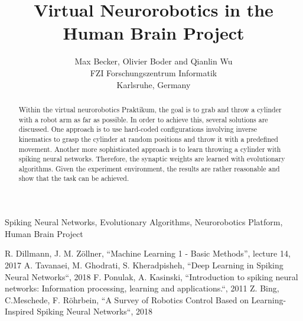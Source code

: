 \documentclass[conference]{IEEEtran}
\begin{document}
\title{Virtual Neurorobotics in the Human Brain Project}
\author{Max Becker, Olivier Boder and Qianlin Wu\\FZI Forschungszentrum Informatik\\Karlsruhe, Germany}

\maketitle
\thispagestyle{plain}
\pagestyle{plain}

\begin{abstract}
Within the virtual neurorobotics Praktikum, the goal is to grab and throw a cylinder with a robot arm as far as possible.
In order to achieve this, several solutions are discussed.
One approach is to use hard-coded configurations involving inverse kinematics to grasp the cylinder at random positions and throw it with a predefined movement.
Another more sophisticated approach is to learn throwing a cylinder with spiking neural networks.
Therefore, the synaptic weights are learned with evolutionary algorithms.
Given the experiment environment, the results are rather reasonable and show that the task can be achieved.
\end{abstract}


\begin{IEEEkeywords}
Spiking Neural Networks, Evolutionary Algorithms, Neurorobotics Platform, Human Brain Project
\end{IEEEkeywords}












\begin{thebibliography}{00}
 R. Dillmann, J. M. Z{\"o}llner, ``Machine Learning 1 - Basic Methods'', lecture 14, 2017
 A. Tavanaei, M. Ghodrati, S. Kheradpisheh, ``Deep Learning in Spiking Neural Networks``, 2018
 F. Ponulak, A. Kasinski, ``Introduction to spiking neural networks: Information processing, learning and applications.``, 2011
 Z. Bing, C.Meschede, F. R{\"o}hrbein, ``A Survey of Robotics Control Based on Learning-Inspired Spiking Neural Networks``, 2018
\end{thebibliography}
\end{document}
